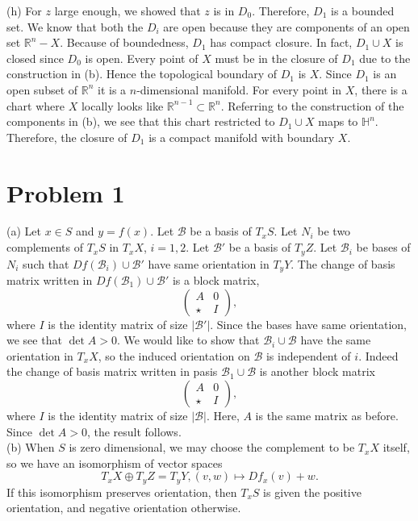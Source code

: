 \documentclass{amsart}
\numberwithin{equation}{section}
\theoremstyle{plain}
\theoremstyle{definition}
\theoremstyle{remark}
\newcommand{\B}{\mathcal B}
\renewcommand{\_}[2]{\underbrace{#1}_{#2}}
\renewcommand{\^}[2]{\overbrace{#1}_{#2}}
\newcommand{\R}{\mathbb{R}}
\begin{document}
(h) For $z$ large enough, we showed that $z$ is in $D_0$. Therefore, $D_1$ is a bounded set. We know that both the $D_i$ are open because they are components of an open set $\R^n-X$. Because of boundedness, $D_1$ has compact closure. In fact, $D_1 \cup X$ is closed since $D_0$ is open. Every point of $X$ must be in the closure of $D_1$ due to the construction in (b). Hence the topological boundary of $D_1$ is $X$. Since $D_1$ is an open subset of $\R^n$ it is a $n$-dimensional manifold. For every point in $X$, there is a chart where $X$ locally looks like $\R^{n-1} \subset \R^n$. Referring to the construction of the components in (b), we see that this chart restricted to $D_1 \cup X$ maps to $\mathbb H^n$. Therefore, the closure of $D_1$ is a compact manifold with boundary $X$. 

\section*{Problem 1}
(a) Let $x\in S$ and $y = f(x)$. Let $\B$ be a basis of $T_xS$. Let $N_i$ be two complements of $T_xS$ in $T_xX$, $i = 1,2$. Let $\B'$ be a basis of $T_yZ$. Let $\B_i$ be bases of $N_i$ such that $Df(\B_i) \cup \B'$ have same orientation in $T_yY$. The change of basis matrix written in $Df(\B_1) \cup \B'$ is a block matrix, \[
  \begin{pmatrix}
    A & 0\\ \star & I
  \end{pmatrix},\] where $I$ is the identity matrix of size $|\B'|$. Since the bases have same orientation, we see that $\det A > 0$. We would like to show that $\B_i \cup \B$ have the same orientation in $T_xX$, so the induced orientation on $\B$ is independent of $i$. Indeed the change of basis matrix written in pasis $\B_1 \cup \B$ is another block matrix \[
  \begin{pmatrix}
    A & 0\\ \star & I
  \end{pmatrix},\] where $I$ is the identity matrix of size $|\B|$. Here, $A$ is the same matrix as before. Since $\det A>0$, the result follows.\\

(b) When $S$ is zero dimensional, we may choose the complement to be $T_xX$ itself, so we have an isomorphism of vector spaces \[T_xX \oplus T_yZ = T_yY, (v,w) \mapsto Df_x(v) + w.\] If this isomorphism preserves orientation, then $T_xS$ is given the positive orientation, and negative orientation otherwise.
\end{document}
